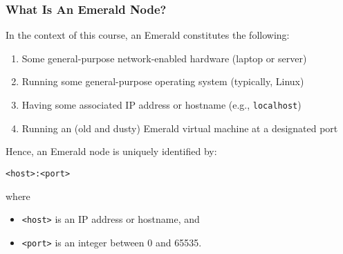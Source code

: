 \begin{frame}

\frametitle{What Is An Emerald Node?}

In the context of this course, an Emerald constitutes the following:

\begin{enumerate}

\footnotesize

\item Some general-purpose network-enabled hardware (laptop or server)

\item Running some general-purpose operating system (typically, Linux)

\item Having some associated IP address or hostname (e.g.,
\texttt{localhost})

\item Running an (old and dusty) Emerald virtual machine at a
designated port

\end{enumerate}

\vspace{\fill}

Hence, an Emerald node is uniquely identified by:

\begin{center}

\texttt{<host>:<port>}

\end{center}

where

\begin{itemize}

\footnotesize

\item \texttt{<host>} is an IP address or hostname, and

\item \texttt{<port>} is an integer between 0 and 65535.

\end{itemize}

\end{frame}

